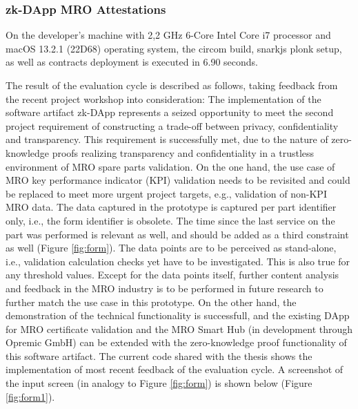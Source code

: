 \subsubsection{zk-DApp MRO Attestations}
On the developer's machine with 2,2 GHz 6-Core Intel Core i7 processor and macOS 13.2.1 (22D68) operating system, the circom build, snarkjs plonk setup, as well as contracts deployment is executed in 6.90 seconds. 

The result of the evaluation cycle is described as follows, taking feedback from the recent project workshop into consideration: The implementation of the software artifact zk-DApp represents a seized opportunity to meet the second project requirement of constructing a trade-off between privacy, confidentiality and transparency. This requirement is successfully met, due to the nature of zero-knowledge proofs realizing transparency and confidentiality in a trustless environment of MRO spare parts validation. On the one hand, the use case of MRO key performance indicator (KPI) validation needs to be revisited and could be replaced to meet more urgent project targets, e.g., validation of non-KPI MRO data. The data captured in the prototype is captured per part identifier only, i.e., the form identifier is obsolete. The time since the last service on the part was performed is relevant as well, and should be added as a third constraint as well (Figure \ref{fig:form}). The data points are to be perceived as stand-alone, i.e., validation calculation checks yet have to be investigated. This is also true for any threshold values. Except for the data points itself, further content analysis and feedback in the MRO industry is to be performed in future research to further match the use case in this prototype. On the other hand, the demonstration of the technical functionality is successfull, and the existing DApp for MRO certificate validation and the MRO Smart Hub (in development through Opremic GmbH) can be extended with the zero-knowledge proof functionality of this software artifact. The current code shared with the thesis shows the implementation of most recent feedback of the evaluation cycle. A screenshot of the input screen (in analogy to Figure \ref{fig:form}) is shown below (Figure \ref{fig:form1}).
